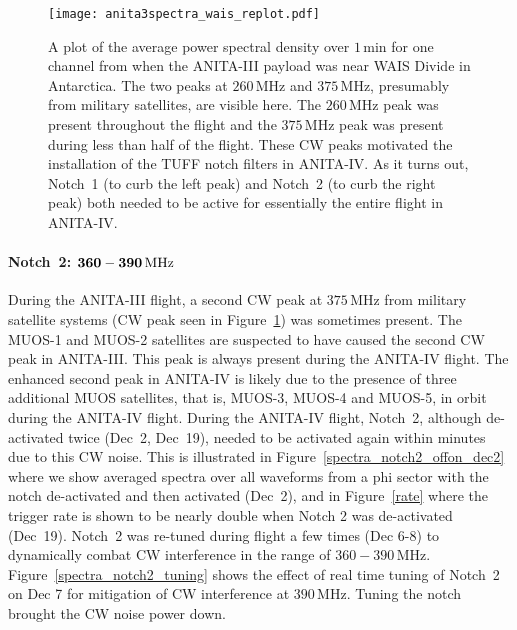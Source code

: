 \documentclass[preprint,12pt]{elsarticle}
\begin{document}
\begin{figure}[H]
\centering
\texttt{[image: anita3spectra\_wais\_replot.pdf]}
\caption{A plot of the average power spectral density over $1\,\mbox{min}$ for one channel from 
when the ANITA-III payload was near WAIS Divide in Antarctica. The two peaks at $260\,\mbox{MHz}$ and
 $375\,\mbox{MHz}$, presumably from military satellites, are visible here. The $260\,\mbox{MHz}$ peak 
 was present throughout the flight and the $375\,\mbox{MHz}$ peak was present during less than half of the flight. 
 These CW peaks 
 motivated the installation of the TUFF notch filters in ANITA-IV. As it turns out, Notch~1 (to curb the left peak) and 
 Notch~2 (to curb the right peak) both needed to be active for essentially the entire flight in ANITA-IV.}
\label{anita3spectra_wais}
\end{figure}

 \paragraph{Notch~2: $\bold{360 - 390}\,\mbox{MHz}$}

During the ANITA-III flight, a second CW peak at $375\,\mbox{MHz}$ from military satellite systems
 (CW peak seen in Figure~\ref{anita3spectra_wais}) was sometimes present. 
 The MUOS-1 and MUOS-2 satellites are suspected to have caused the second CW peak in ANITA-III.
 This peak is always present during the ANITA-IV flight. 
 The enhanced second peak in ANITA-IV is likely due to the presence of 
 three additional MUOS satellites, that is, MUOS-3, MUOS-4 and MUOS-5, in orbit during the ANITA-IV flight. 
  During the ANITA-IV flight, Notch~2, although de-activated twice (Dec~2, Dec~19), needed 
  to be activated again within minutes due to this CW noise. 
This is illustrated 
in Figure~\ref{spectra_notch2_offon_dec2} where we show averaged spectra over all waveforms from a phi sector
with the notch de-activated and then activated (Dec~2), and in Figure~\ref{rate} where the trigger rate is 
shown to be nearly double when Notch 2 was de-activated (Dec~19). 
Notch~2 was re-tuned during flight a few times (Dec 6-8) to dynamically combat CW interference in 
the range of $360 - 390\,\mbox{MHz}$. Figure~\ref{spectra_notch2_tuning} shows the effect of real time
 tuning of Notch~2 on Dec 7 for mitigation of CW interference at $390\,\mbox{MHz}$. Tuning the notch brought the CW noise power down. 
\end{document}
